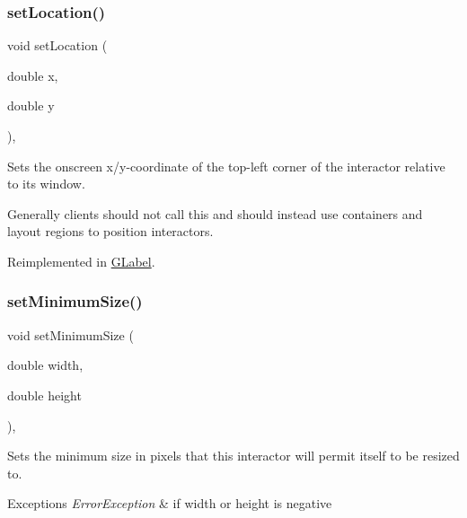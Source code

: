 \subsubsection{\texorpdfstring{set\+Location()}{setLocation()}}
{\footnotesize\ttfamily void set\+Location (\begin{DoxyParamCaption}\item[{double}]{x,  }\item[{double}]{y }\end{DoxyParamCaption})\hspace{0.3cm}{\ttfamily [virtual]}, {\ttfamily [inherited]}}



Sets the onscreen x/y-\/coordinate of the top-\/left corner of the interactor relative to its window. 

Generally clients should not call this and should instead use containers and layout regions to position interactors. 

Reimplemented in \mbox{\hyperlink{classGLabel_ae3b17c0aeb355dc23c4e4cbf066e81f7}{G\+Label}}.

\mbox{\label{classGInteractor_a0cf428e207b7f22cc08138a90b1b87b2}} 
\subsubsection{\texorpdfstring{set\+Minimum\+Size()}{setMinimumSize()}\hspace{0.1cm}{\footnotesize\ttfamily [1/2]}}
{\footnotesize\ttfamily void set\+Minimum\+Size (\begin{DoxyParamCaption}\item[{double}]{width,  }\item[{double}]{height }\end{DoxyParamCaption})\hspace{0.3cm}{\ttfamily [virtual]}, {\ttfamily [inherited]}}



Sets the minimum size in pixels that this interactor will permit itself to be resized to. 


\begin{DoxyExceptions}{Exceptions}
{\em Error\+Exception} & if width or height is negative \\
\hline
\end{DoxyExceptions}
\mbox{\label{classGInteractor_a3b1046117ac6cb7abe467e00ba8a81f4}} 
